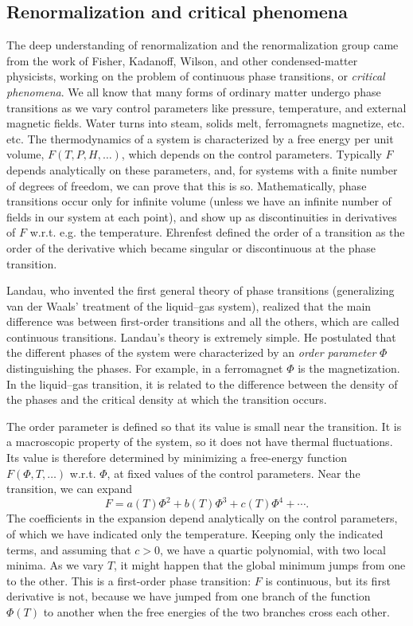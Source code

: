 \subsection{Renormalization and critical phenomena}

The deep understanding of renormalization and the renormalization group came
from the work of Fisher, Kadanoff, Wilson, and other condensed-matter
physicists, working on the problem of continuous phase transitions, or
\emph{critical phenomena}. We all know that many forms of ordinary matter
undergo phase transitions as we vary control parameters like pressure,
temperature, and external magnetic fields. Water turns into steam, solids
melt, ferromagnets magnetize, etc. etc. The thermodynamics of a system is
characterized by a free energy per unit volume,
$F(T,P,H,\ldots)$, which depends on the control parameters. Typically $F$
depends analytically on these parameters, and, for systems with a finite number
of degrees of freedom, we can prove that this is so. Mathematically, phase
transitions occur only for infinite volume (unless we have an infinite number
of fields in our system at each point), and show up as discontinuities in
derivatives of $F$ w.r.t. e.g. the temperature. Ehrenfest defined the order of
a transition as the order of the derivative which became singular or
discontinuous at the phase transition.


Landau, who invented the first general theory of phase transitions
(generalizing van der Waals' treatment of the liquid--gas system), realized
that the main difference was between first-order transitions and all the
others, which are called continuous transitions. Landau's theory is extremely
simple. He postulated that the different phases of the system were
characterized by an \emph{order parameter} $\Phi$ distinguishing the phases.
For example, in a ferromagnet $\Phi$ is the magnetization. In the liquid--gas
transition, it is related to the difference between the density of the phases
and the critical density at which the transition occurs.

The order parameter is defined so that its value is small near the transition.
It is a macroscopic property of the system, so it does not have thermal
fluctuations. Its value is therefore determined by minimizing a free-energy
function $F(\Phi,T,\ldots)$ w.r.t. $\Phi$, at fixed values of the control
parameters. Near the transition, we can expand
\[
  F=a(T)\Phi^2+b(T)\Phi^3+c(T)\Phi^4+\cdots .
\]
The coefficients in the expansion depend analytically on the control
parameters, of which we have indicated only the temperature. Keeping only the
indicated terms, and assuming that $c>0$, we have a quartic polynomial, with
two local minima. As we vary $T$, it might happen that the global minimum
jumps from one to the other. This is a first-order phase transition: $F$ is
continuous, but its first derivative is not, because we have jumped from one
branch of the function $\Phi(T)$ to another when the free energies of the two
branches cross each other.

